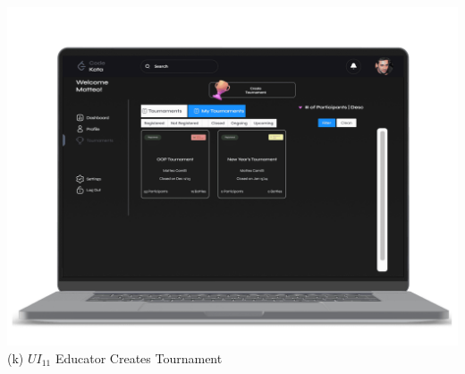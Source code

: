 \begin{center}
\includegraphics[scale=0.13]{Images/ui-ux/educator_create_tournament_4.png}
        (k) $UI_{11}$ Educator Creates Tournament
\end{center}
\newpage
